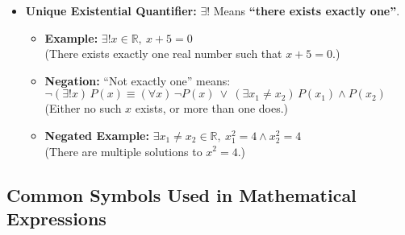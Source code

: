 \begin{itemize}[label=\(-\)]
	\item\textbf{Unique Existential Quantifier:}  \(\exists\)!
		Means \textbf{``there exists exactly one''}.

		\begin{itemize}
			\item \textbf{Example:}
\vspace{\baselineskip}
  \(\exists! x \in \mathbb{R},\ x + 5 = 0\) \\
			      (There exists exactly one real number such that \( x + 5 = 0 \).)

			\item \textbf{Negation:}  ``Not exactly one'' means:
			      \(
				      \neg (\exists! x)\, P(x) \equiv (\forall x)\, \neg P(x)\ \lor\ (\exists x_1 \neq x_2)\, P(x_1) \land P(x_2)
			      \)
			      (Either no such \( x \) exists, or more than one does.)

			\item \textbf{Negated Example:}  \(\exists x_1 \neq x_2 \in \mathbb{R},\ x_1^2 = 4 \land x_2^2 = 4\) \\
			      (There are multiple solutions to \( x^2 = 4 \).)
		\end{itemize}

\end{itemize}
\subsection{Common Symbols Used in Mathematical Expressions}

